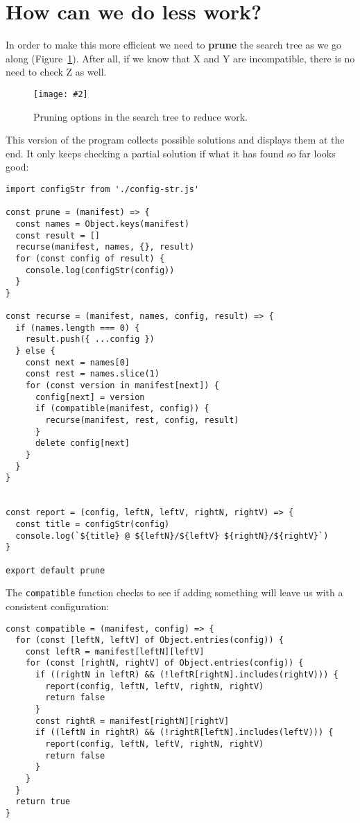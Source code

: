 \documentclass[krantzl]{krantz}
\newcommand{\figpdf}[4]{\begin{figure}%
\centering%
\texttt{[image: \#2]}%
\caption{#3}%
\label{#1}%
\end{figure}}
\newcommand{\figref}[1]{Figure~\ref{#1}}
\newcommand{\glossref}[1]{\textbf{#1}}
\begin{document}
\section{How can we do less work?}\label{package-manager-optimize}


In order to make this more efficient we need to \glossref{prune} the search tree
as we go along
(\figref{package-manager-pruning}).
After all,
if we know that X and Y are incompatible,
there is no need to check Z as well.

\figpdf{package-manager-pruning}{./package-manager/pruning.pdf}{Pruning options in the search tree to reduce work.}{0.6}


This version of the program collects possible solutions and displays them at the end.
It only keeps checking a partial solution if what it has found so far looks good:


\begin{lstlisting}[frame=single,frameround=tttt]
import configStr from './config-str.js'

const prune = (manifest) => {
  const names = Object.keys(manifest)
  const result = []
  recurse(manifest, names, {}, result)
  for (const config of result) {
    console.log(configStr(config))
  }
}

const recurse = (manifest, names, config, result) => {
  if (names.length === 0) {
    result.push({ ...config })
  } else {
    const next = names[0]
    const rest = names.slice(1)
    for (const version in manifest[next]) {
      config[next] = version
      if (compatible(manifest, config)) {
        recurse(manifest, rest, config, result)
      }
      delete config[next]
    }
  }
}


const report = (config, leftN, leftV, rightN, rightV) => {
  const title = configStr(config)
  console.log(`${title} @ ${leftN}/${leftV} ${rightN}/${rightV}`)
}

export default prune
\end{lstlisting}



The \texttt{compatible} function checks to see if adding something will leave us with a consistent configuration:


\begin{lstlisting}[frame=single,frameround=tttt]
const compatible = (manifest, config) => {
  for (const [leftN, leftV] of Object.entries(config)) {
    const leftR = manifest[leftN][leftV]
    for (const [rightN, rightV] of Object.entries(config)) {
      if ((rightN in leftR) && (!leftR[rightN].includes(rightV))) {
        report(config, leftN, leftV, rightN, rightV)
        return false
      }
      const rightR = manifest[rightN][rightV]
      if ((leftN in rightR) && (!rightR[leftN].includes(leftV))) {
        report(config, leftN, leftV, rightN, rightV)
        return false
      }
    }
  }
  return true
}
\end{lstlisting}
\end{document}
